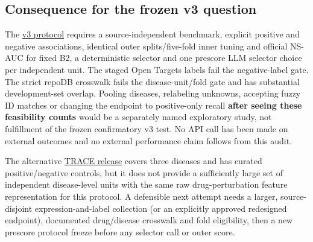 \documentclass[
  10pt,
]{ctexart}
\begin{document}
\subsection{Consequence for the frozen v3
question}\label{consequence-for-the-frozen-v3-question}

The \href{method_selection_v3_protocol.md}{v3 protocol} requires a
source-independent benchmark, explicit positive and negative
associations, identical outer splits/five-fold inner tuning and official
NS-AUC for fixed B2, a deterministic selector and one prescore LLM
selector choice per independent unit. The staged Open Targets labels
fail the negative-label gate. The strict repoDB crosswalk fails the
disease-unit/fold gate and has substantial development-set overlap.
Pooling diseases, relabeling unknowns, accepting fuzzy ID matches or
changing the endpoint to positive-only recall \textbf{after seeing these
feasibility counts} would be a separately named exploratory study, not
fulfillment of the frozen confirmatory v3 test. No API call has been
made on external outcomes and no external performance claim follows from
this audit.

The alternative
\href{https://data.mendeley.com/datasets/fy93xjjrb8/1}{TRACE release}
covers three diseases and has curated positive/negative controls, but it
does not provide a sufficiently large set of independent disease-level
units with the same raw drug-perturbation feature representation for
this protocol. A defensible next attempt needs a larger, source-disjoint
expression-and-label collection (or an explicitly approved redesigned
endpoint), documented drug/disease crosswalk and fold eligibility, then
a new prescore protocol freeze before any selector call or outer score.
\end{document}

